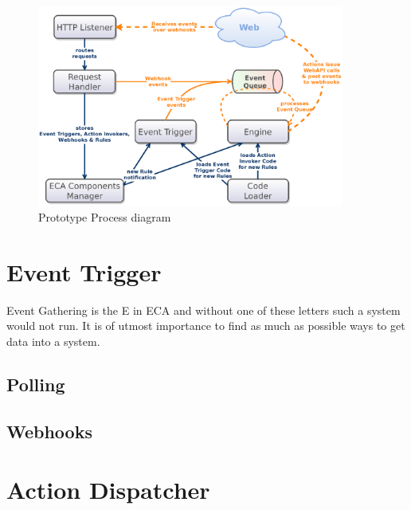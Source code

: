 
\begin{figure}[!ht]
	\centering
  \includegraphics[width=0.9\textwidth]{figures/Architecture_wET}
	\caption{Prototype Process diagram}
	\label{fig:Architecture_wET}
\end{figure}


\section{Event Trigger}

Event Gathering is the E in ECA and without one of these letters such a system would not run.
It is of utmost importance to find as much as possible ways to get data into a system.



\subsection{Polling}

\subsection{Webhooks}







\section{Action Dispatcher}

